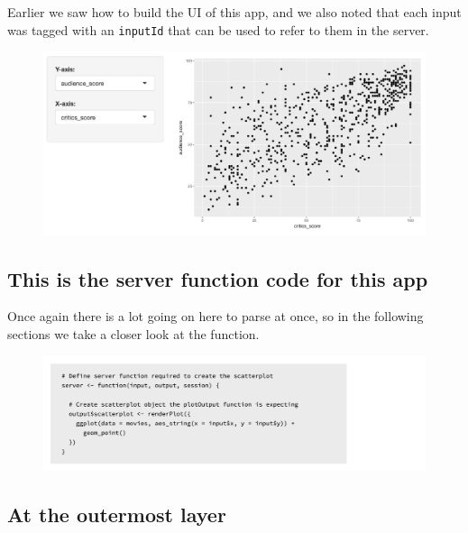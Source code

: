 \documentclass[
  letterpaper,
  DIV=11,
  numbers=noendperiod]{scrreprt}
\begin{document}
Earlier we saw how to build the UI of this app, and we also noted that
each input was tagged with an \texttt{inputId} that can be used to refer
to them in the server.

\begin{figure}

{\centering \includegraphics[width=1\textwidth,height=\textheight]{./images/app-selectinput-scatterplot.png}

}

\end{figure}

\hypertarget{this-is-the-server-function-code-for-this-app-2}{%
\subsection{This is the server function code for this
app}\label{this-is-the-server-function-code-for-this-app-2}}

Once again there is a lot going on here to parse at once, so in the
following sections we take a closer look at the function.

\begin{figure}

{\centering \includegraphics[width=1\textwidth,height=\textheight]{./images/server.png}

}

\end{figure}

\hypertarget{at-the-outermost-layer-2}{%
\subsection{At the outermost layer}\label{at-the-outermost-layer-2}}
\end{document}

